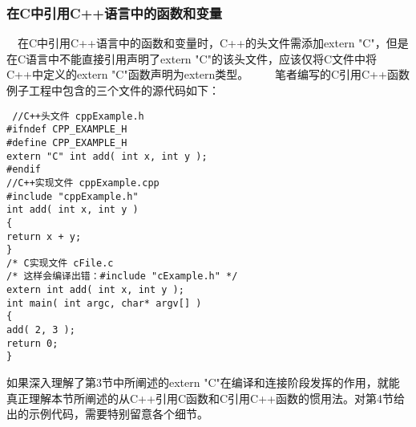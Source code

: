 \subsubsection{在C中引用C++语言中的函数和变量}
　在C中引用C++语言中的函数和变量时，C++的头文件需添加extern "C"，但是在C语言中不能直接引用声明了extern "C"的该头文件，应该仅将C文件中将C++中定义的extern "C"函数声明为extern类型。
　　笔者编写的C引用C++函数例子工程中包含的三个文件的源代码如下：
\begin{verbatim}
 //C++头文件 cppExample.h
#ifndef CPP_EXAMPLE_H
#define CPP_EXAMPLE_H
extern "C" int add( int x, int y );
#endif
//C++实现文件 cppExample.cpp
#include "cppExample.h"
int add( int x, int y )
{
return x + y;
}
/* C实现文件 cFile.c
/* 这样会编译出错：#include "cExample.h" */
extern int add( int x, int y );
int main( int argc, char* argv[] )
{
add( 2, 3 ); 
return 0;
}
\end{verbatim} 


如果深入理解了第3节中所阐述的extern "C"在编译和连接阶段发挥的作用，就能真正理解本节所阐述的从C++引用C函数和C引用C++函数的惯用法。对第4节给出的示例代码，需要特别留意各个细节。 
